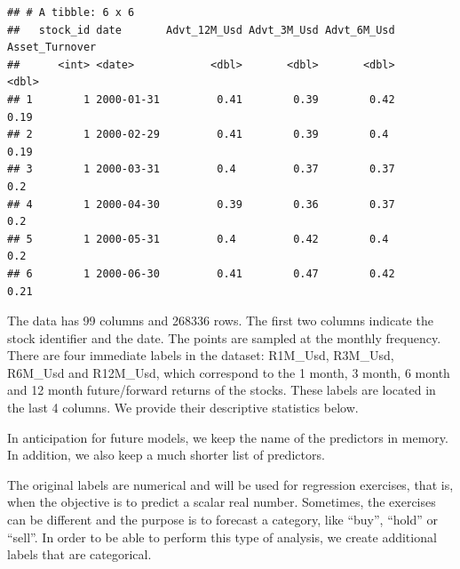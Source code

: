 \documentclass[]{krantz}
\makeatletter
\newenvironment{Shaded}{\begin{snugshade}}{\end{snugshade}}
\newcommand{\CommentTok}[1]{\textcolor[rgb]{0.37,0.37,0.37}{\textit{#1}}}
\newcommand{\DataTypeTok}[1]{\textcolor[rgb]{0.27,0.27,0.27}{#1}}
\newcommand{\KeywordTok}[1]{\textcolor[rgb]{0.27,0.27,0.27}{\textbf{#1}}}
\newcommand{\NormalTok}[1]{#1}
\newcommand{\OperatorTok}[1]{\textcolor[rgb]{0.43,0.43,0.43}{\textbf{#1}}}
\newcommand{\StringTok}[1]{\textcolor[rgb]{0.5,0.5,0.5}{#1}}
\newenvironment{kframe}{%
\medskip{}
\setlength{\fboxsep}{.8em}
 \def\at@end@of@kframe{}%
 \ifinner\ifhmode%
  \def\at@end@of@kframe{\end{minipage}}%
  \begin{minipage}{\columnwidth}%
 \fi\fi%
 \def\FrameCommand##1{\hskip\@totalleftmargin \hskip-\fboxsep
 \colorbox{shadecolor}{##1}\hskip-\fboxsep
     \hskip-\linewidth \hskip-\@totalleftmargin \hskip\columnwidth}%
 \MakeFramed {\advance\hsize-\width
   \@totalleftmargin\z@ \linewidth\hsize
   \@setminipage}}%
 {\par\unskip\endMakeFramed%
 \at@end@of@kframe}
\renewenvironment{Shaded}{\begin{kframe}}{\end{kframe}}
\theoremstyle{definition}
\theoremstyle{definition}
\theoremstyle{definition}
\theoremstyle{remark}
\makeatother
\begin{document}
\begin{verbatim}
## # A tibble: 6 x 6
##   stock_id date       Advt_12M_Usd Advt_3M_Usd Advt_6M_Usd Asset_Turnover
##      <int> <date>            <dbl>       <dbl>       <dbl>          <dbl>
## 1        1 2000-01-31         0.41        0.39        0.42           0.19
## 2        1 2000-02-29         0.41        0.39        0.4            0.19
## 3        1 2000-03-31         0.4         0.37        0.37           0.2 
## 4        1 2000-04-30         0.39        0.36        0.37           0.2 
## 5        1 2000-05-31         0.4         0.42        0.4            0.2 
## 6        1 2000-06-30         0.41        0.47        0.42           0.21
\end{verbatim}

\normalsize

The data has 99 columns and 268336 rows. The first two columns indicate
the stock identifier and the date. The points are sampled at the monthly
frequency. There are four immediate labels in the dataset: R1M\_Usd,
R3M\_Usd, R6M\_Usd and R12M\_Usd, which correspond to the 1 month, 3
month, 6 month and 12 month future/forward returns of the stocks. These
labels are located in the last 4 columns. We provide their descriptive
statistics below.

\footnotesize

\normalsize

In anticipation for future models, we keep the name of the predictors in
memory. In addition, we also keep a much shorter list of predictors.
\footnotesize

\normalsize

The original labels are numerical and will be used for regression
exercises, that is, when the objective is to predict a scalar real
number. Sometimes, the exercises can be different and the purpose is to
forecast a category, like ``buy'', ``hold'' or ``sell''. In order to be
able to perform this type of analysis, we create additional labels that
are categorical.

\footnotesize

\begin{Shaded}
\end{Shaded}
\end{document}
